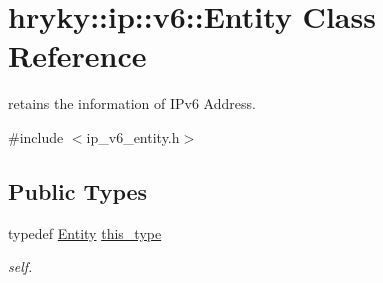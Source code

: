 \hypertarget{classhryky_1_1ip_1_1v6_1_1_entity}{\section{hryky\-:\-:ip\-:\-:v6\-:\-:Entity Class Reference}
\label{classhryky_1_1ip_1_1v6_1_1_entity}
}


retains the information of I\-Pv6 Address.  




{\ttfamily \#include $<$ip\-\_\-v6\-\_\-entity.\-h$>$}

\subsection*{Public Types}
\begin{DoxyCompactItemize}
\item 
\hypertarget{classhryky_1_1ip_1_1v6_1_1_entity_a2d767b52e28cf8fea606e918d13bfbd7}{typedef \hyperlink{classhryky_1_1ip_1_1v6_1_1_entity}{Entity} \hyperlink{classhryky_1_1ip_1_1v6_1_1_entity_a2d767b52e28cf8fea606e918d13bfbd7}{this\-\_\-type}}\label{classhryky_1_1ip_1_1v6_1_1_entity_a2d767b52e28cf8fea606e918d13bfbd7}

\begin{DoxyCompactList}\small\item\em self. \end{DoxyCompactList}\end{DoxyCompactItemize}
